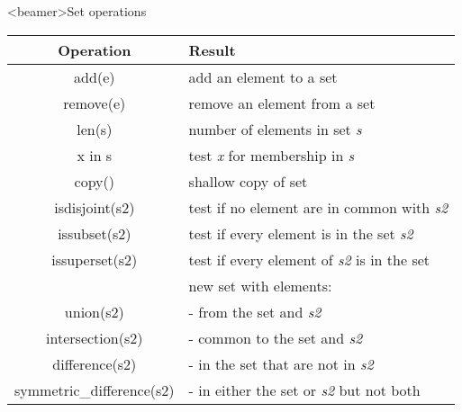 \begin{frame}<beamer>{Set operations}

  \begin{center}

  \begin{tabular}{| c | l |}
    \hline
    \textbf{Operation} & \textbf{Result} \\
    \hline
    add(e) 				& add an element to a set \\
    remove(e) 			& remove an element from a set \\
    len(s) 				& number of elements in set \textit{s} \\
    x in s 				& test \textit{x} for membership in \textit{s} \\
    copy() 				& shallow copy of set \\
    isdisjoint(s2) 		& test if no element are in common with \textit{s2} \\
    issubset(s2) 		& test if every element is in the set \textit{s2} \\
	issuperset(s2) 		& test if every element of \textit{s2} is in the set \\
	                    & new set with elements: \\
	union(s2) 			& - from the set and \textit{s2} \\
	intersection(s2) 	& - common to the set and \textit{s2} \\
	difference(s2) 		& - in the set that are not in \textit{s2} \\
	{\scriptsize symmetric\_difference(s2)} 	& - in either the set or \textit{s2} but not both \\
    \hline
  \end{tabular}

  \end{center}

\end{frame}


